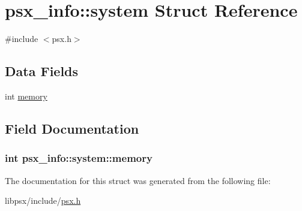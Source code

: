 \hypertarget{structpsx__info_1_1system}{}\section{psx\+\_\+info\+:\+:system Struct Reference}
\label{structpsx__info_1_1system}


{\ttfamily \#include $<$psx.\+h$>$}

\subsection*{Data Fields}
\begin{DoxyCompactItemize}
\item 
int \hyperlink{structpsx__info_1_1system_a95e9c8433456eed32ee8b64308ce7778}{memory}
\end{DoxyCompactItemize}


\subsection{Field Documentation}
\hypertarget{structpsx__info_1_1system_a95e9c8433456eed32ee8b64308ce7778}{}
\subsubsection[{memory}]{\setlength{\rightskip}{0pt plus 5cm}int psx\+\_\+info\+::system\+::memory}\label{structpsx__info_1_1system_a95e9c8433456eed32ee8b64308ce7778}


The documentation for this struct was generated from the following file\+:\begin{DoxyCompactItemize}
\item 
libpsx/include/\hyperlink{psx_8h}{psx.\+h}\end{DoxyCompactItemize}
